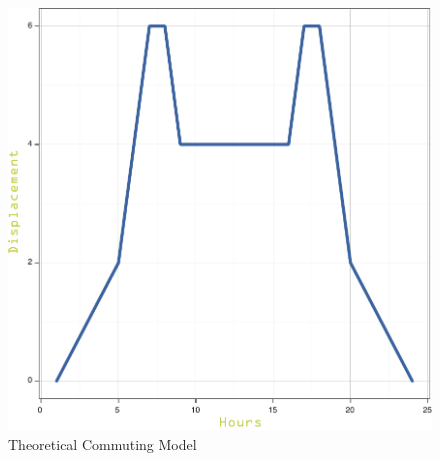  
 \begin{figure}[h]
\begin{center}
\includegraphics[scale =0.6] {results/images/common_commuting_model.pdf}
\caption{Theoretical Commuting Model}
\label{fig:commuting}
\end{center}
\end{figure}